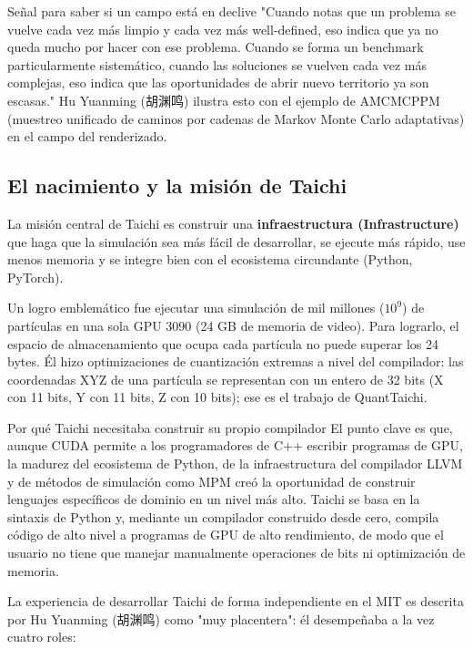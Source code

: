 \documentclass[a4paper]{article}
\begin{document}
\begin{knowledgebox}{Señal para saber si un campo está en declive}
"Cuando notas que un problema se vuelve cada vez más limpio y cada vez más well-defined, eso indica que ya no queda mucho por hacer con ese problema. Cuando se forma un benchmark particularmente sistemático, cuando las soluciones se vuelven cada vez más complejas, eso indica que las oportunidades de abrir nuevo territorio ya son escasas." Hu Yuanming (胡渊鸣) ilustra esto con el ejemplo de AMCMCPPM (muestreo unificado de caminos por cadenas de Markov Monte Carlo adaptativas) en el campo del renderizado.
\end{knowledgebox}

\subsection{El nacimiento y la misión de Taichi}

La misión central de Taichi es construir una \textbf{infraestructura (Infrastructure)} que haga que la simulación sea más fácil de desarrollar, se ejecute más rápido, use menos memoria y se integre bien con el ecosistema circundante (Python, PyTorch).

Un logro emblemático fue ejecutar una simulación de mil millones ($10^9$) de partículas en una sola GPU 3090 (24 GB de memoria de video). Para lograrlo, el espacio de almacenamiento que ocupa cada partícula no puede superar los 24 bytes. Él hizo optimizaciones de cuantización extremas a nivel del compilador: las coordenadas XYZ de una partícula se representan con un entero de 32 bits (X con 11 bits, Y con 11 bits, Z con 10 bits); ese es el trabajo de QuantTaichi.

\begin{importantbox}{Por qué Taichi necesitaba construir su propio compilador}
El punto clave es que, aunque CUDA permite a los programadores de C++ escribir programas de GPU, la madurez del ecosistema de Python, de la infraestructura del compilador LLVM y de métodos de simulación como MPM creó la oportunidad de construir lenguajes específicos de dominio en un nivel más alto. Taichi se basa en la sintaxis de Python y, mediante un compilador construido desde cero, compila código de alto nivel a programas de GPU de alto rendimiento, de modo que el usuario no tiene que manejar manualmente operaciones de bits ni optimización de memoria.
\end{importantbox}

La experiencia de desarrollar Taichi de forma independiente en el MIT es descrita por Hu Yuanming (胡渊鸣) como "muy placentera": él desempeñaba a la vez cuatro roles:
\end{document}
